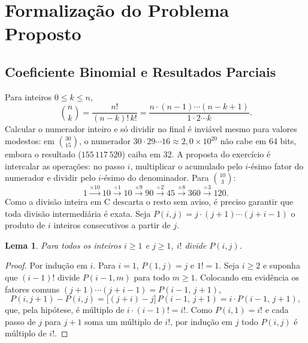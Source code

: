 \documentclass[a4paper, 12pt]{article}
\newtheorem{lema}{Lema}
\begin{document}
\section{Formalização do Problema Proposto}

\subsection{Coeficiente Binomial e Resultados Parciais}

Para inteiros $0 \le k \le n$,
\[
    \binom{n}{k} = \frac{n!}{(n-k)!\,k!}
                 = \frac{n \cdot (n-1) \cdots (n-k+1)}{1 \cdot 2 \cdots k}.
\]
Calcular o numerador inteiro e só dividir no final é inviável mesmo para
valores modestos: em $\binom{30}{15}$, o numerador
$30 \cdot 29 \cdots 16 \approx 2{,}0 \times 10^{20}$ não cabe em 64 bits,
embora o resultado ($155\,117\,520$) caiba em 32. A proposta do exercício é
intercalar as operações: no passo $i$, multiplicar o acumulado pelo
$i$-ésimo fator do numerador e dividir pelo $i$-ésimo do denominador. Para
$\binom{10}{3}$:
\begin{equation}\label{eq:exemplo}
    1 \xrightarrow{\times 10} 10 \xrightarrow{\div 1} 10
      \xrightarrow{\times 9} 90 \xrightarrow{\div 2} 45
      \xrightarrow{\times 8} 360 \xrightarrow{\div 3} 120.
\end{equation}
Como a divisão inteira em C descarta o resto sem aviso, é preciso garantir
que toda divisão intermediária é exata. Seja
$P(i,j) = j \cdot (j+1) \cdots (j+i-1)$ o produto de $i$ inteiros
consecutivos a partir de $j$.

\begin{lema}\label{lema:div}
    Para todos os inteiros $i \ge 1$ e $j \ge 1$, $i!$ divide $P(i,j)$.
\end{lema}

\begin{proof}
Por indução em $i$. Para $i = 1$, $P(1,j) = j$ e $1! = 1$. Seja $i \ge 2$ e
suponha que $(i-1)!$ divide $P(i-1,m)$ para todo $m \ge 1$. Colocando em
evidência os fatores comuns $(j+1) \cdots (j+i-1) = P(i-1,\,j+1)$,
\[
    P(i,j+1) - P(i,j) = \big[(j+i) - j\big]\, P(i-1,\,j+1)
                      = i \cdot P(i-1,\,j+1),
\]
que, pela hipótese, é múltiplo de $i \cdot (i-1)! = i!$. Como
$P(i,1) = i!$ e cada passo de $j$ para $j+1$ soma um múltiplo de $i!$, por
indução em $j$ todo $P(i,j)$ é múltiplo de $i!$.
\end{proof}
\end{document}
